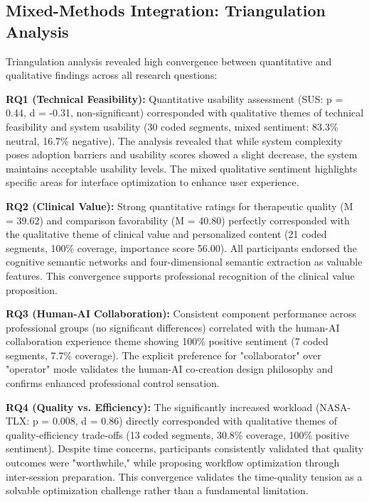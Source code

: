 \documentclass[]{interact}
\begin{document}
\subsection{Mixed-Methods Integration: Triangulation Analysis}

Triangulation analysis revealed high convergence between quantitative and qualitative findings across all research questions:

\textbf{RQ1 (Technical Feasibility):} Quantitative usability assessment (SUS: p = 0.44, d = -0.31, non-significant) corresponded with qualitative themes of technical feasibility and system usability (30 coded segments, mixed sentiment: 83.3\% neutral, 16.7\% negative). The analysis revealed that while system complexity poses adoption barriers and usability scores showed a slight decrease, the system maintains acceptable usability levels. The mixed qualitative sentiment highlights specific areas for interface optimization to enhance user experience.

\textbf{RQ2 (Clinical Value):} Strong quantitative ratings for therapeutic quality (M = 39.62) and comparison favorability (M = 40.80) perfectly corresponded with the qualitative theme of clinical value and personalized content (21 coded segments, 100\% coverage, importance score 56.00). All participants endorsed the cognitive semantic networks and four-dimensional semantic extraction as valuable features. This convergence supports professional recognition of the clinical value proposition.

\textbf{RQ3 (Human-AI Collaboration):} Consistent component performance across professional groups (no significant differences) correlated with the human-AI collaboration experience theme showing 100\% positive sentiment (7 coded segments, 7.7\% coverage). The explicit preference for "collaborator" over "operator" mode validates the human-AI co-creation design philosophy and confirms enhanced professional control sensation.

\textbf{RQ4 (Quality vs. Efficiency):} The significantly increased workload (NASA-TLX: p = 0.008, d = 0.86) directly corresponded with qualitative themes of quality-efficiency trade-offs (13 coded segments, 30.8\% coverage, 100\% positive sentiment). Despite time concerns, participants consistently validated that quality outcomes were "worthwhile," while proposing workflow optimization through inter-session preparation. This convergence validates the time-quality tension as a solvable optimization challenge rather than a fundamental limitation.
\end{document}
